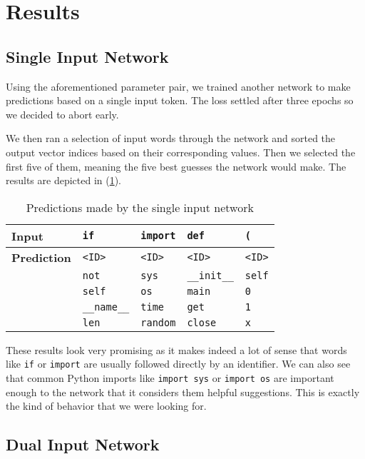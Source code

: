\section{Results}
\label{sec:results}

  \subsection{Single Input Network}
  \label{sub:single_input_network}
  
    Using the aforementioned parameter pair, we trained another network to make predictions based on
    a single input token. The loss settled after three epochs so we decided to abort early.

    We then ran a selection of input words through the network and sorted the output vector indices
    based on their corresponding values. Then we selected the first five of them, meaning the five
    best guesses the network would make. The results are depicted in (\ref{tab:singleres}).
    
    \begin{table}[htpb]
      \centering
      \label{tab:singleres}
      \begin{tabular}{l | l | l | l | l}
        \textbf{Input} & \verb+if+ & \verb+import+ & \verb+def+ & \verb+(+ \\ \hline  
        \textbf{Prediction}  &  \verb+<ID>+ &\verb+<ID>+  & \verb+<ID>+ & \verb+<ID>+ \\
          & \verb+not+ & \verb+sys+ & \verb+__init__+ & \verb+self+ \\
          & \verb+self+ & \verb+os+ & \verb+main+ & \verb+0+ \\
          & \verb+__name__+ & \verb+time+ & \verb+get+ & \verb+1+ \\
          & \verb+len+ & \verb+random+ & \verb+close+ & \verb+x+ \\
      \end{tabular}
      \caption{Predictions made by the single input network}
    \end{table}

    These results look very promising as it makes indeed a lot of sense that words like
    \verb+if+ or \verb+import+ are usually followed directly by an identifier. We can also
    see that common Python imports like \verb+import sys+ or \verb+import os+ are important
    enough to the network that it considers them helpful suggestions. This is exactly
    the kind of behavior that we were looking for.

  \subsection{Dual Input Network}
  \label{sub:dual_input_network}
    
